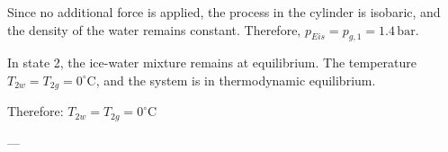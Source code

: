 Since no additional force is applied, the process in the cylinder is isobaric, and the density of the water remains constant. Therefore, \( p_{Eis} = p_{g,1} = 1.4 \, \text{bar} \).  

In state 2, the ice-water mixture remains at equilibrium. The temperature \( T_{2w} = T_{2g} = 0^\circ \text{C} \), and the system is in thermodynamic equilibrium.  

Therefore:  
\( T_{2w} = T_{2g} = 0^\circ \text{C} \)  

---